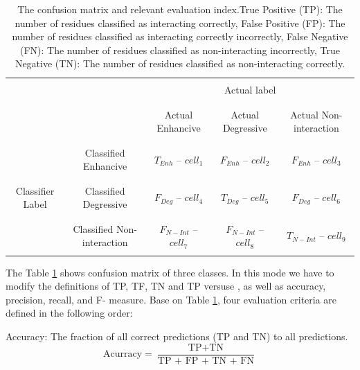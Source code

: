 \documentclass{bmcart}
\begin{document}
\begin{table}[h!]
	\centering
	\begin{tabular}{|c|c|c|c|c|}
		\cline{3-5}
		\multicolumn{2}{c}{}&\multicolumn{3}{|c|}{}\\
		\multicolumn{2}{c}{}&\multicolumn{3}{|c|}{Actual label}\\
		\multicolumn{2}{c}{}&\multicolumn{3}{|c|}{}\\
		\cline{3-5}
		\multicolumn{2}{c|}{}&&&\\
		\multicolumn{2}{c|}{} & Actual Enhancive & Actual Degressive & Actual Non-interaction\\
		\multicolumn{2}{c|}{}&&&\\
		\cline{1-5}
		&&&&\\
		\multirow{7}{*}{Classifier Label} & Classified Enhancive & $T_{Enh}$ -- $cell_1$	 & $F_{Enh}$ -- $cell_2$&$F_{Enh}$ -- $cell_3$\\
		&&&&\\
		\cline{2-5}
		&&&&\\
		&Classified Degressive & $F_{Deg}$ -- $cell_4$ & $T_{Deg}$ -- $cell_5$&$F_{Deg}$ -- $cell_6$\\
		&&&&\\
		\cline{2-5}
		&&&&\\
		&Classified Non-interaction &$F_{N-Int}$ -- $cell_7$&$F_{N-Int}$ -- $cell_8$&$T_{N-Int}$ -- $cell_9$\\
		&&&&\\
		\cline{1-5}
	\end{tabular}
	\newline
	\caption{The confusion matrix and relevant evaluation index.True Positive (TP): The number of residues classified as interacting correctly, False Positive (FP): The number of residues classified as interacting correctly incorrectly, False Negative (FN): The number of residues classified as non-interacting incorrectly, True Negative (TN): The number of residues classified as non-interacting correctly.}
	\label{confusion_matrix_temp}
\end{table}

The Table \ref{confusion_matrix_temp} shows confusion matrix of three classes. In this mode we have to modify the definitions of TP, TF, TN and TP versuse , as well as accuracy, precision, recall, and F- measure. Base on Table \ref{confusion_matrix_temp}, four evaluation criteria are defined in the following order:

Accuracy: The fraction of all correct predictions (TP and TN) to all predictions.
$$ \mbox{Acurracy} =  \frac{ \mbox{TP} + \mbox{TN}}{\mbox{TP + FP + TN + FN}} $$
\end{document}

